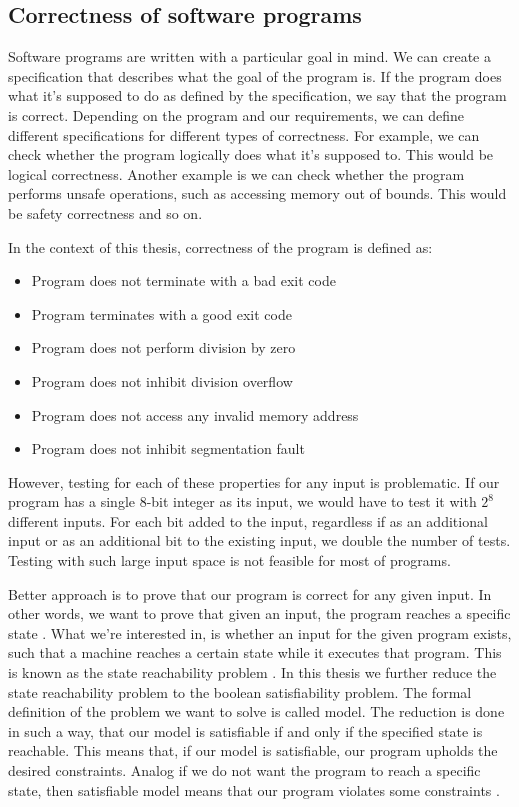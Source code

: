 \documentclass[12pt]{article}
\begin{document}
\subsection{Correctness of software programs}

Software programs are written with a particular goal in mind. We can create a 
specification that describes what the goal of the program is. If the program 
does what it's supposed to do as defined by the specification, we say that the
program is correct. Depending on the program and our requirements, we can define
different specifications for different types of correctness. For example, we can
check whether the program logically does what it's supposed to. This would be 
logical correctness. Another example is we can check whether the program
performs unsafe operations, such as accessing memory out of bounds. This would
be safety correctness and so on.

In the context of this thesis, correctness of the program is defined as:

\begin{itemize}
    \item Program does not terminate with a bad exit code
    \item Program terminates with a good exit code
    \item Program does not perform division by zero
    \item Program does not inhibit division overflow
    \item Program does not access any invalid memory address
    \item Program does not inhibit segmentation fault
\end{itemize}

However, testing for each of these properties for any input is problematic. If
our program has a single 8-bit integer as its input, we would have to test it 
with $2^{8}$ different inputs. For each bit added to the input, regardless
if as an additional input or as an additional bit to the existing input, we
double the number of tests. Testing with such large input space is not feasible
for most of programs.

Better approach is to prove that our program is correct for any given input. In
other words, we want to prove that given an input, the program reaches a
specific state \cite{dunlop1982comparative}. What we're interested in, is
whether an input for the given program exists, such that a machine reaches a
certain state while it executes that program. This is known as the state
reachability problem \cite{abdulla2000symbolic}. In this thesis we further
reduce the state reachability problem to the boolean satisfiability problem.
The formal definition of the problem we want to solve is called model. The
reduction is done in such a way, that our model is satisfiable if and only if
the specified state is reachable. This means that, if our model is satisfiable,
our program upholds the desired constraints. Analog if we do not want the
program to reach a specific state, then satisfiable model means that our
program violates some constraints \cite{brummayer2008btor}.
\end{document}
